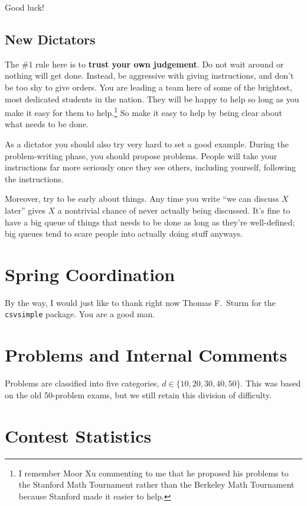 \documentclass[11pt]{scrreprt}
\begin{document}
Good luck!

\section{New Dictators}
The \#1 rule here is to \textbf{trust your own judgement}. Do not wait around or nothing will get done. Instead, be aggressive with giving instructions, and don't be too shy to give orders. You are leading a team here of some of the brightest, most dedicated students in the nation.
They will be happy to help so long as you make it easy for them to help.\footnote{I remember Moor Xu commenting to me that he proposed his problems to the Stanford Math Tournament rather than the Berkeley Math Tournament because Stanford made it easier to help.}
So make it easy to help by being clear about what needs to be done.

As a dictator you should also try very hard to set a good example. During the problem-writing phase, you should propose problems.
People will take your instructions far more seriously once they see others, including yourself, following the instructions.

Moreover, try to be early about things.
Any time you write ``we can discuss $X$ later'' gives $X$ a nontrivial chance of never actually being discussed.
It's fine to have a big queue of things that needs to be done as long as they're well-defined; big queues tend to scare people
into actually doing stuff anyways.

\appendix
\chapter{Spring Coordination}
\label{appendix:coordination}

By the way, I would just like to thank right now Thomas F.\ Sturm for
the \verb+csvsimple+ package.  You are a good man.

\begin{center}
\end{center}

\chapter{Problems and Internal Comments}
Problems are classified into five categories, $d \in \{10,20,30,40,50\}$.
This was based on the old 50-problem exams, but we still retain this division of difficulty.

\lstset{breaklines=true,numbers=none,basicstyle=\footnotesize,aboveskip=-2ex,belowskip=1ex}


\chapter{Contest Statistics}
\lstset{breaklines=true,numbers=none,basicstyle=\tiny,aboveskip=-2ex,belowskip=1ex}

\end{document}
